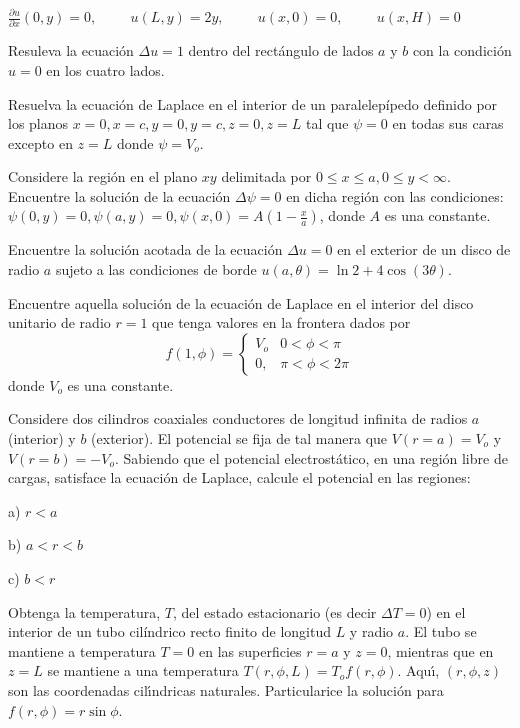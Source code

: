 \documentclass[11pt,spanish]{article}
\begin{document}
 $\frac{\partial u}{\partial x}(0,y)=0, \hspace{1cm} u(L,y)=2y, \hspace{1cm} u(x,0)=0, \hspace{1cm} u(x,H)=0$

\prob{} Resuleva la ecuaci\'on $\Delta u=1$ dentro del rect\'angulo de lados $a$ y $b$ con la condici\'on $u=0$ en los cuatro lados.





\prob{} Resuelva la ecuación de Laplace en el interior de un paralelepípedo definido por los planos $x=0, x=c, y=0, y=c, z=0, z=L$ tal que $\psi=0$ en todas sus caras excepto en $z=L$ donde $\psi=V_o$.

\prob{} Considere la región en el plano $xy$ delimitada por $0 \leq x \leq a,
0 \leq y < \infty$. Encuentre la solución de la ecuación $\Delta \psi =0 $ en dicha región con las condiciones: $\psi(0,y)=0, \psi(a,y)=0, \psi(x,0)=A(1-\frac{x}{a})$, donde $A$ es una constante.

\prob{}
Encuentre la soluci\'on acotada de la ecuaci\'on $\Delta u=0$ en el exterior de un disco de radio $a$ sujeto a las condiciones de borde $u(a,\theta)= \ln 2 + 4 \cos(3\theta)$.

\prob{} 
Encuentre aquella soluci\'on de la ecuaci\'on de Laplace en el  interior del disco unitario de radio $r=1$ que tenga valores en la frontera dados por $$f(1, \phi)=\begin{cases} 
      V_o               & 0<\phi<\pi \\
      0,  & \pi<\phi<2 \pi 
      \end{cases}$$
donde $V_o$ es una constante.


\prob{} Considere dos cilindros coaxiales conductores de longitud infinita de radios $a$ (interior) y $b$ (exterior). El potencial se fija de tal manera que $V(r=a)=V_o$ y $V(r=b)=-V_o$. Sabiendo que el potencial electrostático, en una región libre de cargas, satisface la ecuación de Laplace, calcule el potencial en las regiones:

a) $r < a$

b) $a <r < b$

c) $b < r$

\prob{}  Obtenga la temperatura, $T$, del estado estacionario (es decir $\Delta T=0$) en el interior de un tubo cilíndrico recto finito de longitud $L$ y radio $a$. El tubo se mantiene a temperatura $T=0$  en las superficies $r=a$ y $z=0$, mientras que en $z=L$ se mantiene a una temperatura $T(r,\phi , L)=T_o f(r,\phi)$. Aqu\'{\i}, $(r,\phi , z)$ son las coordenadas cil\'{\i}ndricas naturales. Particularice la solución para $f(r, \phi)=r \sin \phi$.
\end{document}

